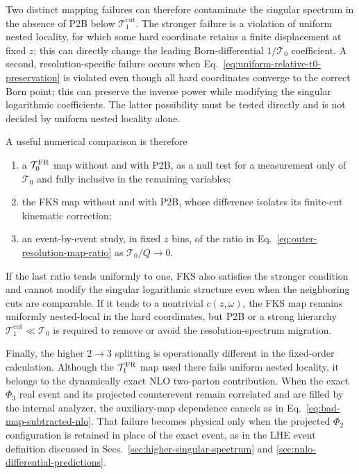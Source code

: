 \documentclass[11pt]{article}
\newcommand{\cut}{\mathrm{cut}}
\newcommand{\Ph}{\Phi}
\begin{document}
Two distinct mapping failures can therefore contaminate the singular spectrum in the absence of P2B below
$\mathcal T_1^{\cut}$. The stronger failure is a violation of uniform nested locality, for which some hard
coordinate retains a finite displacement at fixed $z$; this can directly change the leading
Born-differential $1/\mathcal T_0$ coefficient. A second, resolution-specific failure occurs when
Eq.~\eqref{eq:uniform-relative-t0-preservation} is violated even though all hard coordinates converge to the
correct Born point; this can preserve the inverse power while modifying the singular logarithmic
coefficients. The latter possibility must be tested directly and is not decided by uniform nested locality
alone.

A useful numerical comparison is therefore
\begin{enumerate}[label=(\alph*)]
\item a $\mathcal T_0^{\rm FR}$ map without and with P2B, as a null test for a measurement only of
$\mathcal T_0$ and fully inclusive in the remaining variables;
\item the FKS map without and with P2B, whose difference isolates its finite-cut kinematic correction;
\item an event-by-event study, in fixed $z$ bins, of the ratio in
Eq.~\eqref{eq:outer-resolution-map-ratio} as $\mathcal T_0/Q\to0$.
\end{enumerate}
If the last ratio tends uniformly to one, FKS also satisfies the stronger condition and cannot modify the
singular logarithmic structure even when the neighboring cuts are comparable. If it tends to a nontrivial
$c(z,\omega)$, the FKS map remains uniformly nested-local in the hard coordinates, but P2B or a strong
hierarchy $\mathcal T_1^{\cut}\ll\mathcal T_0$ is required to remove or avoid the resolution-spectrum
migration.

Finally, the higher $2\to3$ splitting is operationally different in the fixed-order calculation. Although
the $\mathcal T_1^{\rm FR}$ map used there fails uniform nested locality, it belongs to the dynamically exact
NLO two-parton contribution. When the exact $\Ph_3$ real event and its projected counterevent remain
correlated and are filled by the internal analyzer, the auxiliary-map dependence cancels as in
Eq.~\eqref{eq:bad-map-subtracted-nlo}. That failure becomes physical only when the projected $\Ph_2$
configuration is retained in place of the exact event, as in the LHE event definition discussed in
Secs.~\ref{sec:higher-singular-spectrum} and \ref{sec:nnlo-differential-predictions}.
\end{document}
